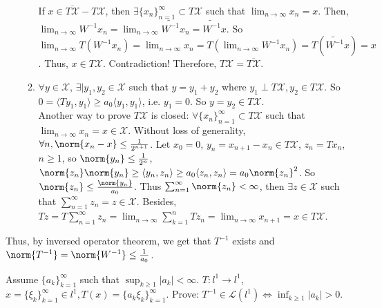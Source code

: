 \documentclass{ctexart}
\begin{document}
\begin{solution}
\begin{enumerate}
\begin{enumerate}
      If \(x \in \overline{T \mathcal{X} } \minus T \mathcal{X}\), then \(\exists \{x_n\}_{n=1}^{\infty} \subset T \mathcal{X}\) such that
      \(\lim_{n \to \infty} x_n=x\). Then, \(\lim_{n \to \infty}W^{-1} x_n=\lim_{n \to \infty} \widetilde{W^{-1}}x_n=\widetilde{W^{-1}}x \).
      So \(\lim_{n \to \infty} T(W^{-1}x_n)=\lim_{n \to \infty} x_n=T(\lim_{n \to \infty} W^{-1}x_n)=T(\widetilde{W^{-1}}x)=x\).
      Thus, \(x \in T \mathcal{X}\). Contradiction! Therefore, \(T \mathcal{X}=\overline{T \mathcal{X}}\).
      \item \(\forall y \in \mathcal{X}\), \(\exists| y_1, y_2 \in \mathcal{X}\) such that \(y= y_1+y_2\) where \(y_1 \perp T \mathcal{X}, y_2 \in T \mathcal{X}\).
        So \(0 = \langle T y_1 , y_1 \rangle \geq a_0 \langle y_1 , y_1 \rangle\), i.e. \(y_1=0\).
        So \(y=y_2 \in T \mathcal{X}\).\\

Another way to prove \(T \mathcal{X}\) is closed: \(\forall \{x_n\}_{n=1}^{\infty} \subset T \mathcal{X}\) such that
 \(\lim_{n \to \infty} x_n=x \in \mathcal{X}\). Without loss of generality, \(\forall n, \norm{x_n-x} \leq \frac{1}{2^{n+1}}\).
 Let \(x_0=0\), \(y_n=x_{n+1}-x_n \in T \mathcal{X}\), \(z_n= T x_n\), \(n \geq 1\), so \(\norm{y_n}\leq \frac{1}{2^{n}}\), \(\norm{z_n} \norm{y_n} \geq\langle y_n , z_n \rangle \geq a_0 \langle z_n , z_n \rangle= a_{0} \norm{z_n}^2\). 
 So  \(\norm{z_n} \leq \frac{\norm{y_n}}{a_0}\). Thus \(\sum_{n=1}^{\infty} \norm{z_n} < \infty\), then \(\exists z \in \mathcal{X} \) such that
 \(\sum_{n=1}^{\infty} z_n=z \in \mathcal{X}\). Besides, \( T z = T \sum_{n=1}^{\infty} z_n =\lim_{n \to \infty}\sum_{k=1}^{n} T z_n= \lim_{n \to \infty} x_{n+1} = x \in T \mathcal{X} \).
    \end{enumerate}
 \end{enumerate} 
 Thus, by inversed operator theorem, we get that \(T^{-1}\) exists and \(\norm{T^{-1}}= \norm{W^{-1}} \leq \frac{1}{a_{0}}\). 
\end{solution}
\begin{problem}
  Assume \(\{a_k\}_{k=1}^{\infty}\) such that \(\sup_{k \geq 1} |a_k|< \infty\). \(T: l^{1} \to l^{1}\),
  \(x=\{\xi _k\}_{k=1}^{\infty} \in l^{1}, T(x)=\{a_k \xi_k\}_{k=1}^{\infty}.\)
  Prove: \(T^{-1} \in \mathcal{L} (l^1) \iff \inf_{k \geq 1} |a_k|>0\).
\end{problem}
\end{document}
